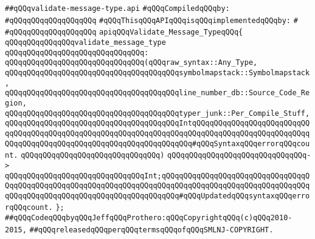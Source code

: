 \label{src/lib/compiler/front/typer/main/validate-message-type.api}
\verb|##qQQqvalidate-message-type.api|\newline
\newline
\verb|#qQQqCompiledqQQqby:|\newline
\verb|#qQQqqQQqqQQqqQQqqQQq|\newline
\newline
\verb|#qQQqThisqQQqAPIqQQqisqQQqimplementedqQQqby:|\newline
\verb|#|\newline
\verb|#qQQqqQQqqQQqqQQqqQQq|\newline
\newline
\newline
\verb|apiqQQqValidate_Message_TypeqQQq{|\newline
\newline
\verb|qQQqqQQqqQQqqQQqvalidate_message_type|\newline
\verb|qQQqqQQqqQQqqQQqqQQqqQQqqQQqqQQq:|\newline
\verb|qQQqqQQqqQQqqQQqqQQqqQQqqQQqqQQq(qQQqraw_syntax::Any_Type,|\newline
\verb|qQQqqQQqqQQqqQQqqQQqqQQqqQQqqQQqqQQqqQQqsymbolmapstack::Symbolmapstack,|\newline
\verb|qQQqqQQqqQQqqQQqqQQqqQQqqQQqqQQqqQQqqQQqline_number_db::Source_Code_Region,|\newline
\verb|qQQqqQQqqQQqqQQqqQQqqQQqqQQqqQQqqQQqqQQqtyper_junk::Per_Compile_Stuff,|\newline
\verb|qQQqqQQqqQQqqQQqqQQqqQQqqQQqqQQqqQQqqQQqIntqQQqqQQqqQQqqQQqqQQqqQQqqQQqqQQqqQQqqQQqqQQqqQQqqQQqqQQqqQQqqQQqqQQqqQQqqQQqqQQqqQQqqQQqqQQqqQQqqQQqqQQqqQQqqQQqqQQqqQQqqQQqqQQqqQQqqQQqqQQq#qQQqSyntaxqQQqerrorqQQqcount.|\newline
\verb|qQQqqQQqqQQqqQQqqQQqqQQqqQQqqQQq)|\newline
\verb|qQQqqQQqqQQqqQQqqQQqqQQqqQQqqQQq->|\newline
\verb|qQQqqQQqqQQqqQQqqQQqqQQqqQQqqQQqInt;qQQqqQQqqQQqqQQqqQQqqQQqqQQqqQQqqQQqqQQqqQQqqQQqqQQqqQQqqQQqqQQqqQQqqQQqqQQqqQQqqQQqqQQqqQQqqQQqqQQqqQQqqQQqqQQqqQQqqQQqqQQqqQQqqQQqqQQqqQQqqQQq#qQQqUpdatedqQQqsyntaxqQQqerrorqQQqcount.|\newline
\verb|};|\newline
\newline
\newline
\verb|##qQQqCodeqQQqbyqQQqJeffqQQqProthero:qQQqCopyrightqQQq(c)qQQq2010-2015,|\newline
\verb|##qQQqreleasedqQQqperqQQqtermsqQQqofqQQqSMLNJ-COPYRIGHT.|\newline

